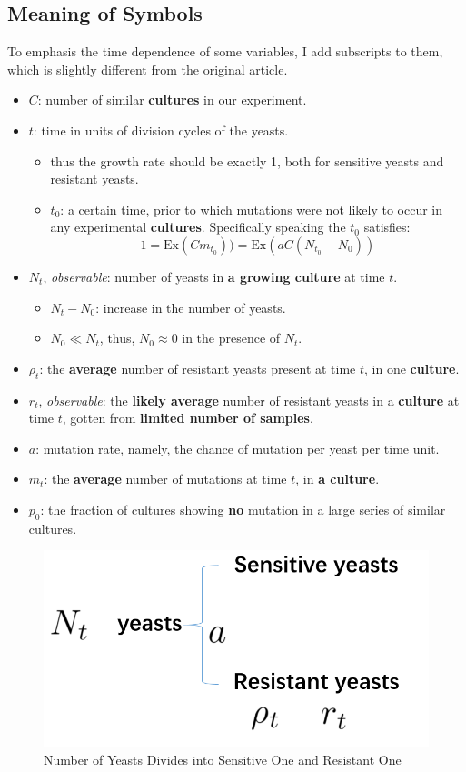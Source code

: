 \documentclass[UTF-8]{article}
\begin{document}
\subsection{Meaning of Symbols}
To emphasis the time dependence of some variables, I add subscripts to them, which is slightly different from the original article.
\begin{itemize}
    \item $C$: number of similar \textbf{cultures} in our experiment.
    \item $t$: time in units of division cycles of the yeasts.
    \begin{itemize}
        \item thus the growth rate should be exactly 1, both for sensitive yeasts and resistant yeasts.
        \item $t_0$: a certain time, prior to which mutations were not likely to occur in any experimental \textbf{cultures}.
        Specifically speaking the $t_0$ satisfies:
        $$
        1=\text{Ex}(Cm_{t_0}))=\text{Ex}(aC(N_{t_0}-N_0))
        $$
    \end{itemize}
    \item $N_t$, \textit{observable}: number of yeasts in \textbf{a growing culture} at time $t$.
    \begin{itemize}
        \item $N_t-N_0$: increase in the number of yeasts.
        \item $N_0\ll N_t$, thus, $N_0\approx 0$ in the presence of $N_t$.
    \end{itemize}
    \item $\rho _t$: the \textbf{average} number of resistant yeasts present at time $t$, in one \textbf{culture}.
    \item $r_t$, \textit{observable}: the \textbf{likely average} number of resistant yeasts in a \textbf{culture} at time $t$, gotten from \textbf{limited number of samples}.
    \item $a$: mutation rate, namely, the chance of mutation per yeast per time unit.
    \item $m_t$: the \textbf{average} number of mutations at time $t$, in \textbf{a culture}.
    \item $p_0$: the fraction of cultures showing \textbf{no} mutation in a large series of similar cultures.


\end{itemize}
\begin{figure}[h]
    \centering
    \includegraphics[width=0.5\linewidth]{../Figures/number of yeasts.png}
    \caption{Number of Yeasts Divides into Sensitive One and Resistant One}
    \label{number of yeasts}
\end{figure}
\end{document}
